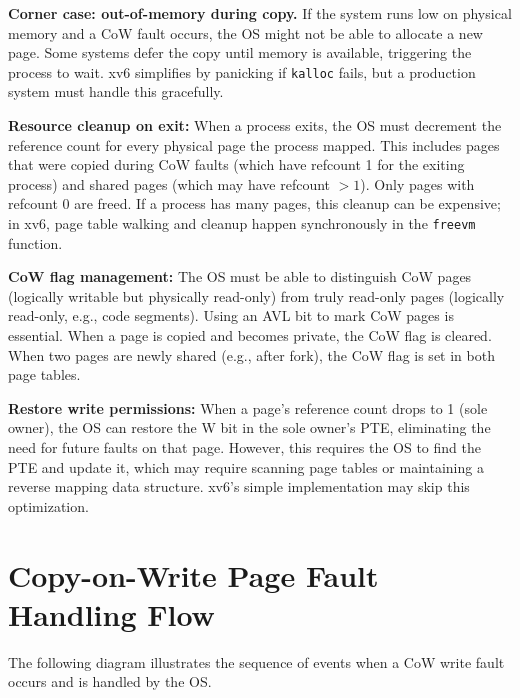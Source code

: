 \documentclass[11pt]{article}
\begin{document}
\textbf{Corner case: out-of-memory during copy.} If the system runs low on physical memory and a CoW fault occurs, the OS might not be able to allocate a new page. Some systems defer the copy until memory is available, triggering the process to wait. xv6 simplifies by panicking if \texttt{kalloc} fails, but a production system must handle this gracefully.

\textbf{Resource cleanup on exit:} When a process exits, the OS must decrement the reference count for every physical page the process mapped. This includes pages that were copied during CoW faults (which have refcount 1 for the exiting process) and shared pages (which may have refcount $> 1$). Only pages with refcount 0 are freed. If a process has many pages, this cleanup can be expensive; in xv6, page table walking and cleanup happen synchronously in the \texttt{freevm} function.

\textbf{CoW flag management:} The OS must be able to distinguish CoW pages (logically writable but physically read-only) from truly read-only pages (logically read-only, e.g., code segments). Using an AVL bit to mark CoW pages is essential. When a page is copied and becomes private, the CoW flag is cleared. When two pages are newly shared (e.g., after fork), the CoW flag is set in both page tables.

\textbf{Restore write permissions:} When a page's reference count drops to 1 (sole owner), the OS can restore the W bit in the sole owner's PTE, eliminating the need for future faults on that page. However, this requires the OS to find the PTE and update it, which may require scanning page tables or maintaining a reverse mapping data structure. xv6's simple implementation may skip this optimization.

\section{Copy-on-Write Page Fault Handling Flow}

The following diagram illustrates the sequence of events when a CoW write fault occurs and is handled by the OS.
\end{document}
